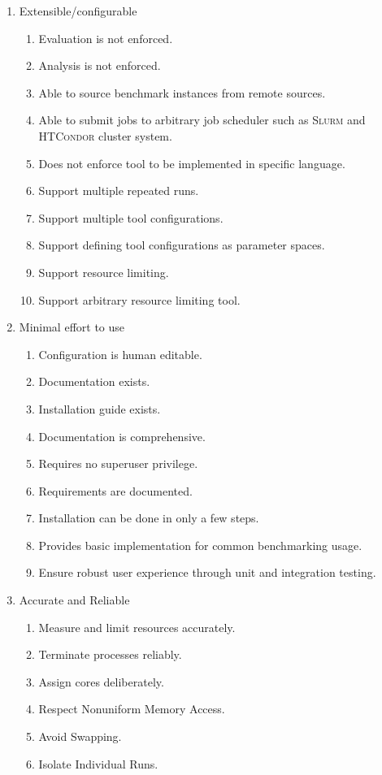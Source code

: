 \begin{enumerate}[noitemsep]
    \item Extensible/configurable
    \begin{enumerate}[noitemsep]
        \item Evaluation is not enforced.
        \item Analysis is not enforced.
        \item Able to source benchmark instances from remote sources.
        \item Able to submit jobs to arbitrary job scheduler such as \textsc{Slurm} and \textsc{HTCondor} cluster system.
        \item Does not enforce tool to be implemented in specific language.
        \item Support multiple repeated runs.
        \item Support multiple tool configurations.
        \item Support defining tool configurations as parameter spaces.
        \item Support resource limiting.
        \item Support arbitrary resource limiting tool.
    \end{enumerate}

    \item Minimal effort to use
    \begin{enumerate}[noitemsep]
        \item Configuration is human editable.
        \item Documentation exists.
        \item Installation guide exists.
        \item Documentation is comprehensive.
        \item Requires no superuser privilege.
        \item Requirements are documented.
        \item Installation can be done in only a few steps.
        \item Provides basic implementation for common benchmarking usage.
        \item Ensure robust user experience through unit and integration testing.
    \end{enumerate}

    \item Accurate and Reliable
    \begin{enumerate}[noitemsep]
        \item Measure and limit resources accurately.
        \item Terminate processes reliably.
        \item Assign cores deliberately.
        \item Respect Nonuniform Memory Access.
        \item Avoid Swapping.
        \item Isolate Individual Runs.
    \end{enumerate}


\end{enumerate}
